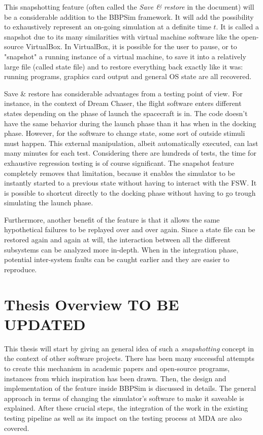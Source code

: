 This snapshotting feature (often called the \textit{Save \& restore} in the document) will be a considerable addition to the \gls{BBPSim} framework. It will add the possibility to exhaustively represent an on-going simulation at a definite time $t$. It is called a snapshot due to its many similarities with virtual machine software like the open-source VirtualBox. In VirtualBox, it is possible for the user to pause, or to "snapshot" a running instance of a virtual machine, to save it into a relatively large file (called state file) and to restore everything back exactly like it was: running programs, graphics card output and general OS state are all recovered.  

Save \& restore has considerable advantages from a testing point of view. For instance, in the context of Dream Chaser, the flight software enters different states depending on the phase of launch the spacecraft is in. The code doesn't have the same behavior during the launch phase than it has when in the docking phase. However, for the software to change state, some sort of outside stimuli must happen. This external manipulation, albeit automatically executed, can last many minutes for each test. Considering there are hundreds of tests, the time for exhaustive regression testing is of course significant. The snapshot feature completely removes that limitation, because it enables the simulator to be instantly started to a previous state without having to interact with the \gls{FSW}. It is possible to shortcut directly to the docking phase without having to go trough simulating the launch phase. 

Furthermore, another benefit of the feature is that it allows the same hypothetical failures to be replayed over and over again. Since a state file can be restored again and again at will, the interaction between all the different subsystems can be analyzed more in-depth. When in the integration phase, potential inter-system faults can be caught earlier and they are easier to reproduce.  

\section{Thesis Overview TO BE UPDATED}
This thesis will start by giving an general idea of such a \textit{snapshotting} concept in the context of other software projects. There has been many successful attempts to create this mechanism in academic papers and open-source programs, instances from which inspiration has been drawn. Then, the design and implementation of the feature inside \gls{BBPSim} is discussed in details. The general approach in terms of changing the simulator's software to make it saveable is explained. After these crucial steps, the integration of the work in the existing testing pipeline as well as its impact on the testing process at MDA are also covered. 
